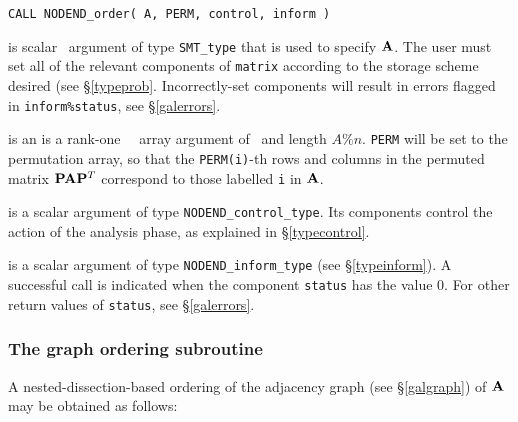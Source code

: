 \documentclass{galahad}
\newcommand{\packagename}{NODEND}
\begin{document}
\hskip0.5in
{\tt CALL \packagename\_order( A, PERM, control, inform )}
\begin{description}
 is scalar \intentin\ argument of type {\tt SMT\_type}
that is used to specify ${\mathbf{A}}$.
The user must set all of the relevant components of {\tt matrix} according
to the storage scheme desired (see \S\ref{typeprob}.
Incorrectly-set components will result in errors
flagged in {\tt inform\%status}, see \S\ref{galerrors}.

 is an 
 is a rank-one \integer\ \intentout\ array argument
of \intentout\ and length $A\%n$.
{\tt PERM} will be set to the permutation array, so that the 
{\tt PERM(i)}-th rows and columns in the permuted matrix 
${\mathbf{P}} {\mathbf{A}} {\mathbf{P}}^T$ correspond to those labelled {\tt i} in ${\mathbf{A}}$.

 is a scalar \intentout argument of type
{\tt \packagename\_control\_type}. Its components control the action
of the analysis phase, as explained in
\S\ref{typecontrol}.

 is a scalar \intentout argument of type
{\tt \packagename\_inform\_type}
(see \S\ref{typeinform}).
A successful call is indicated when the  component {\tt status} has the value 0.
For other return values of {\tt status}, see \S\ref{galerrors}.

\end{description}

\subsubsection{The graph ordering subroutine}\label{subgraphorder}
A nested-dissection-based ordering of the adjacency graph (see 
\S\ref{galgraph}) of ${\mathbf{A}}$ may be obtained as follows:
\vskip2mm
\end{document}
